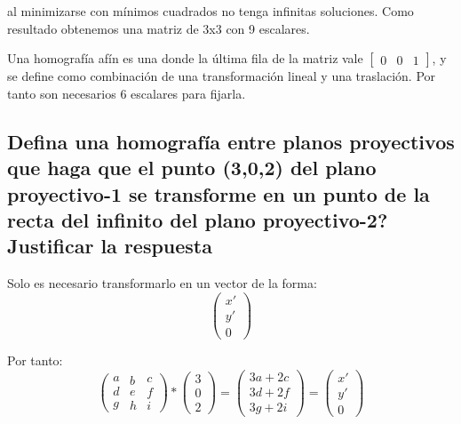 \documentclass[11pt]{scrartcl} %
\begin{document}
al minimizarse con mínimos cuadrados no tenga infinitas soluciones. 
Como resultado obtenemos una matriz de 3x3 con 9 escalares. \newline

Una homografía afín es una donde la última fila de la matriz vale 
$\begin{bmatrix}0 & 0 & 1\end{bmatrix}$, y se define como combinación de una 
transformación lineal y una traslación.
Por tanto son necesarios 6 escalares para fijarla.

\subsection{Defina una homografía entre planos proyectivos que haga que el
punto (3,0,2) del plano proyectivo-1 se transforme en un punto de
la recta del infinito del plano proyectivo-2? Justificar la
respuesta}


Solo es necesario transformarlo en un vector de la forma:
\begin{equation}
	\left( 
		\begin{array}{c}x' \\ y' \\ 0\end{array} 
	\right)
\end{equation}

Por tanto:
\begin{equation}
	\left( 
		\begin{array}{c}a \\ d \\ g\end{array} 
		\begin{array}{c}b \\ e \\ h\end{array} 
		\begin{array}{c}c \\ f \\ i\end{array} 
	\right) *
	\left( 
		\begin{array}{c}3 \\ 0 \\ 2\end{array} 
	\right)
	=
	\left( 
		\begin{array}{c}3a + 2c \\ 3d + 2f \\ 3g + 2i \end{array} 
	\right)
	= 
	\left( 
		\begin{array}{c}x' \\ y' \\ 0\end{array} 
	\right)
\end{equation}
\end{document}
